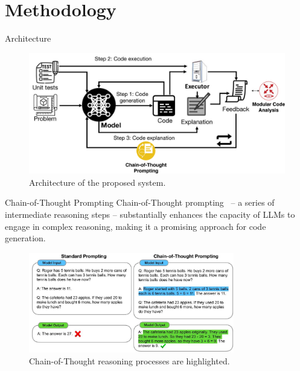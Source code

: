\section{Methodology}

\begin{frame}{Architecture}
    \begin{figure}[!htb]
        \centering
        \includegraphics[width=1\textwidth]{img/enhanced_self_debug}
        \captionsetup{font=small,labelformat=empty}
        \caption{Architecture of the proposed system.}
    \end{figure}
\end{frame}

\begin{frame}{Chain-of-Thought Prompting}
    Chain-of-Thought prompting~\cite{wei2023chainofthought} -- a series of intermediate reasoning steps -- substantially enhances the capacity of LLMs to engage in complex reasoning, making it a promising approach for code generation.
    \begin{figure}[!htb]
        \centering
        \includegraphics[width=0.8\textwidth]{img/cot_prompting}
        \captionsetup{font=small,labelformat=empty}
        \caption{Chain-of-Thought reasoning processes are highlighted.}
    \end{figure}
\end{frame}

